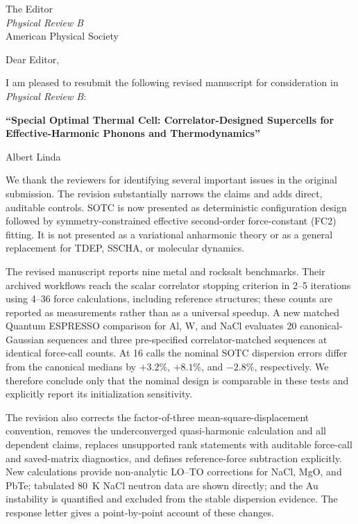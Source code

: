 \documentclass[10pt]{letter}
\date{\today}
\begin{document}
\begin{letter}{The Editor \\
\textit{Physical Review B} \\
American Physical Society}

\opening{Dear Editor,}

I am pleased to resubmit the following revised manuscript for consideration in
\textit{Physical Review B}:

\noindent\textbf{``Special Optimal Thermal Cell: Correlator-Designed
Supercells for Effective-Harmonic Phonons and Thermodynamics''}

\noindent Albert Linda

We thank the reviewers for identifying several important issues in the original
submission.  The revision substantially narrows the claims and adds direct,
auditable controls.  SOTC is now presented as deterministic configuration
design followed by symmetry-constrained effective second-order force-constant
(FC2) fitting.  It is not presented as a variational anharmonic theory or as a
general replacement for TDEP, SSCHA, or molecular dynamics.

The revised manuscript reports nine metal and rocksalt benchmarks.  Their
archived workflows reach the scalar correlator stopping criterion in 2--5
iterations using 4--36 force calculations, including reference structures;
these counts are reported as measurements rather than as a universal speedup.
A new matched Quantum ESPRESSO comparison for Al, W, and NaCl evaluates 20
canonical-Gaussian sequences and three pre-specified correlator-matched
sequences at identical force-call counts.  At 16 calls the nominal SOTC
dispersion errors differ from the canonical medians by $+3.2\%$, $+8.1\%$, and
$-2.8\%$, respectively.  We therefore conclude only that the nominal design is
comparable in these tests and explicitly report its initialization sensitivity.

The revision also corrects the factor-of-three mean-square-displacement
convention, removes the underconverged quasi-harmonic calculation and all
dependent claims, replaces unsupported rank statements with auditable
force-call and saved-matrix diagnostics, and defines reference-force
subtraction explicitly.  New calculations provide non-analytic LO--TO
corrections for NaCl, MgO, and PbTe; tabulated 80~K NaCl neutron data are shown
directly; and the Au instability is quantified and excluded from the stable
dispersion evidence.  The response letter gives a point-by-point account of
these changes.


\end{letter}
\end{document}

